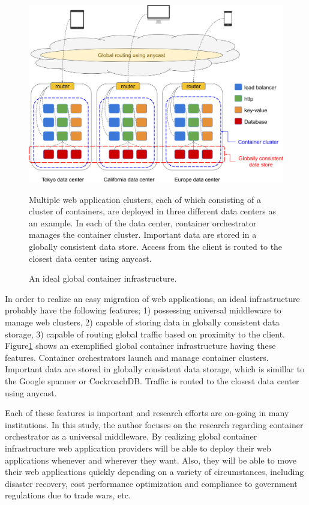 \begin{figure}[h]
\begin{center}
\includegraphics[width=0.9\columnwidth]{Figs/global_container_infrastructure}
\end{center}
\caption{
An ideal global container infrastructure.
}
\centering\parbox[c]{0.9\columnwidth}{
Multiple web application clusters, each of which consisting of a cluster of containers, are deployed in three different data centers as an example.
In each of the data center, container orchestrator manages the container cluster.
Important data are stored in a globally consistent data store.
Access from the client is routed to the closest data center using anycast.
}
\label{fig:global_container_infrastructure}
\end{figure}


In order to realize an easy migration of web applications, an ideal infrastructure probably have the following features;
1) possessing universal middleware to manage web clusters,
2) capable of storing data in globally consistent data storage,
3) capable of routing global traffic based on proximity to the client.
%
Figure\ref{fig:global_container_infrastructure} shows an exemplified global container infrastructure having these features.
Container orchestrators launch and manage container clusters.
Important data are stored in globally consistent data storage, which is simillar to the Google spanner\cite{Corbett:2013:SGG:2518037.2491245,Cooper:2013:SGG:2485732.2485756} or CockroachDB\cite{pavlo2016s}.
Traffic is routed to the closest data center using anycast\cite{rfc1546}.

Each of these features is important and research efforts are on-going in many institutions.
In this study, the author focuses on the research regarding container orchestrator as a universal middleware.
%
By realizing global container infrastructure web application providers will be able to deploy their web applications whenever and wherever they want.
Also, they will be able to move their web applications quickly depending on a variety of circumstances, including disaster recovery, cost performance optimization and compliance to government regulations due to trade wars, etc.



